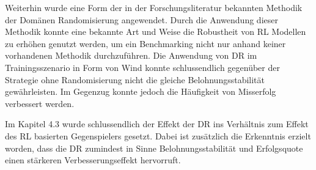 Weiterhin wurde eine Form der in der Forschungsliteratur bekannten Methodik der Domänen Randomisierung angewendet. 
Durch die Anwendung dieser Methodik konnte eine bekannte Art und Weise die Robustheit von RL Modellen zu erhöhen genutzt werden, um ein Benchmarking nicht nur anhand keiner vorhandenen Methodik durchzuführen.
Die Anwendung von DR im Trainingsszenario in Form von Wind konnte schlussendlich gegenüber der Strategie ohne Randomisierung nicht die gleiche Belohnungsstabilität gewährleisten.
Im Gegenzug konnte jedoch die Häufigkeit von Misserfolg verbessert werden.

Im Kapitel 4.3 wurde schlussendlich der Effekt der DR ins Verhältnis zum Effekt des RL basierten Gegenspielers gesetzt.
Dabei ist zusätzlich die Erkenntnis erzielt worden, dass die DR zumindest in Sinne Belohnungsstabilität und Erfolgsquote einen stärkeren Verbesserungseffekt hervorruft.